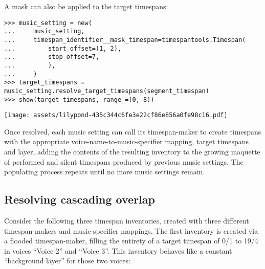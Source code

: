 \noindent A mask can also be applied to the target timespans:

\begin{comment}
<abjad>
music_setting = new(
    music_setting,
    timespan_identifier__mask_timespan=timespantools.Timespan(
        start_offset=(1, 2),
        stop_offset=7,
        ),
    )
target_timespans = music_setting.resolve_target_timespans(segment_timespan)
show(target_timespans, range_=(0, 8))
</abjad>
\end{comment}

\begin{abjadbookoutput}
\begin{singlespacing}
\vspace{-0.5\baselineskip}
\begin{lstlisting}
>>> music_setting = new(
...     music_setting,
...     timespan_identifier__mask_timespan=timespantools.Timespan(
...         start_offset=(1, 2),
...         stop_offset=7,
...         ),
...     )
>>> target_timespans = music_setting.resolve_target_timespans(segment_timespan)
>>> show(target_timespans, range_=(0, 8))
\end{lstlisting}
\noindent\texttt{[image: assets/lilypond-435c344c6fe3e22cf86e856a0fe98c16.pdf]}
\end{singlespacing}
\end{abjadbookoutput}

\noindent Once resolved, each music setting can call its timespan-maker to
create timespans with the appropriate voice-name-to-music-specifier mapping,
target timespans and layer, adding the contents of the resulting inventory to
the growing maquette of performed and silent timespans produced by previous
music settings. The populating process repeats until no more music settings
remain.

\subsection{Resolving cascading overlap}
\label{ssec:resolving-cascading-overlap}

Consider the following three timespan inventories, created with three different
timespan-makers and music-specifier mappings. The first inventory is created
via a flooded timespan-maker, filling the entirety of a target timespan of 0/1
to 19/4 in voices \enquote{Voice 2} and \enquote{Voice 3}. This inventory
behaves like a constant \enquote{background layer} for those two voices:

\begin{comment}
<abjad>
layer_1_timespan_maker = consort.FloodedTimespanMaker()
layer_1_target_timespan = timespantools.Timespan(0, (19, 4))
layer_1_music_specifiers = collections.OrderedDict([
    ('Voice 2', None),
    ('Voice 3', None),
    ])
layer_1 = layer_1_timespan_maker(
    layer=1,
    music_specifiers=layer_1_music_specifiers,
    target_timespan=layer_1_target_timespan,
    )
show(layer_1, key='voice_name', range_=(0, (21, 4)))
</abjad>
\end{comment}

